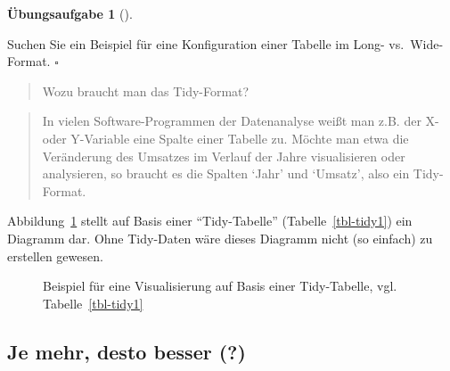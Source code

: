 \documentclass[
  a4paper,
  DIV=11]{scrreprt}
\theoremstyle{definition}
\newtheorem{exercise}{Übungsaufgabe}[chapter]
\theoremstyle{definition}
\theoremstyle{definition}
\theoremstyle{remark}
\begin{document}
\begin{exercise}[]\protect\hypertarget{exr-widelong}{}\label{exr-widelong}

Suchen Sie ein Beispiel für eine Konfiguration einer Tabelle im Long-
vs.~Wide-Format. \(\square\)

\end{exercise}

\begin{quote}
{} Wozu braucht man das Tidy-Format?
\end{quote}

\begin{quote}
{} In vielen Software-Programmen der Datenanalyse
weißt man z.B. der X- oder Y-Variable eine Spalte einer Tabelle zu.
Möchte man etwa die Veränderung des Umsatzes im Verlauf der Jahre
visualisieren oder analysieren, so braucht es die Spalten `Jahr' und
`Umsatz', also ein Tidy-Format.
\end{quote}

Abbildung~\ref{fig-tidy} stellt auf Basis einer ``Tidy-Tabelle''
(Tabelle~\ref{tbl-tidy1}) ein Diagramm dar. Ohne Tidy-Daten wäre dieses
Diagramm nicht (so einfach) zu erstellen gewesen.

\begin{figure}


\caption{\label{fig-tidy}Beispiel für eine Visualisierung auf Basis
einer Tidy-Tabelle, vgl. Tabelle~\ref{tbl-tidy1}}

\end{figure}%

\subsection{Je mehr, desto besser (?)}\label{je-mehr-desto-besser}
\end{document}
